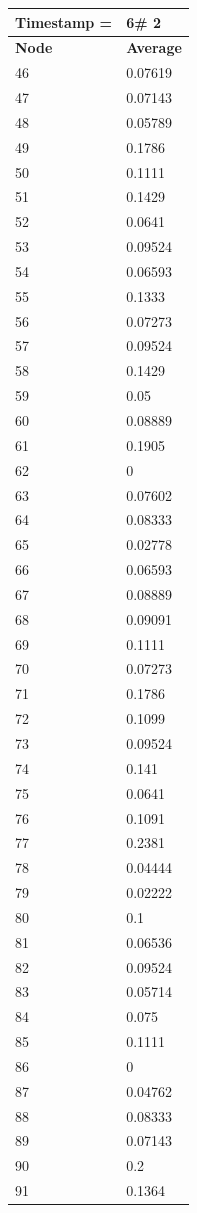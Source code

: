 \begin{tabular}{|l||l|}
\hline
\textbf{Timestamp =} & \textbf{6}\# 2\\\hline
	\textbf{Node} & \textbf{Average} \\ \hline
\hline
	46 & 0.07619 \\ \hline
	47 & 0.07143 \\ \hline
	48 & 0.05789 \\ \hline
	49 & 0.1786 \\ \hline
	50 & 0.1111 \\ \hline
	51 & 0.1429 \\ \hline
	52 & 0.0641 \\ \hline
	53 & 0.09524 \\ \hline
	54 & 0.06593 \\ \hline
	55 & 0.1333 \\ \hline
	56 & 0.07273 \\ \hline
	57 & 0.09524 \\ \hline
	58 & 0.1429 \\ \hline
	59 & 0.05 \\ \hline
	60 & 0.08889 \\ \hline
	61 & 0.1905 \\ \hline
	62 & 0 \\ \hline
	63 & 0.07602 \\ \hline
	64 & 0.08333 \\ \hline
	65 & 0.02778 \\ \hline
	66 & 0.06593 \\ \hline
	67 & 0.08889 \\ \hline
	68 & 0.09091 \\ \hline
	69 & 0.1111 \\ \hline
	70 & 0.07273 \\ \hline
	71 & 0.1786 \\ \hline
	72 & 0.1099 \\ \hline
	73 & 0.09524 \\ \hline
	74 & 0.141 \\ \hline
	75 & 0.0641 \\ \hline
	76 & 0.1091 \\ \hline
	77 & 0.2381 \\ \hline
	78 & 0.04444 \\ \hline
	79 & 0.02222 \\ \hline
	80 & 0.1 \\ \hline
	81 & 0.06536 \\ \hline
	82 & 0.09524 \\ \hline
	83 & 0.05714 \\ \hline
	84 & 0.075 \\ \hline
	85 & 0.1111 \\ \hline
	86 & 0 \\ \hline
	87 & 0.04762 \\ \hline
	88 & 0.08333 \\ \hline
	89 & 0.07143 \\ \hline
	90 & 0.2 \\ \hline
	91 & 0.1364 \\ \hline
\end{tabular}
